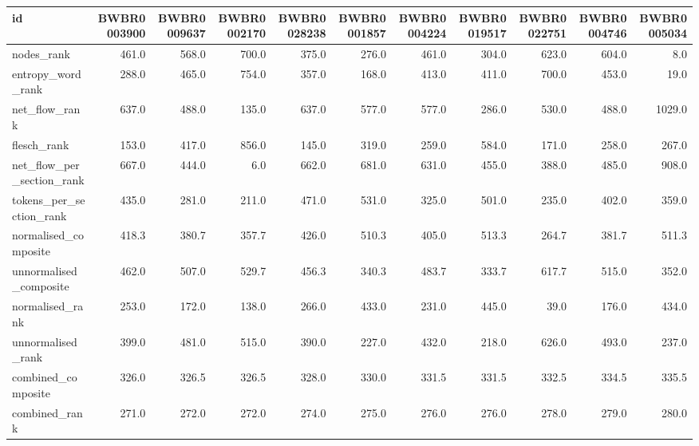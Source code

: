 \begin{tabular}{lrrrrrrrrrr}
\toprule
id & BWBR0003900 & BWBR0009637 & BWBR0002170 & BWBR0028238 & BWBR0001857 & BWBR0004224 & BWBR0019517 & BWBR0022751 & BWBR0004746 & BWBR0005034 \\
\midrule
nodes\_rank & 461.0 & 568.0 & 700.0 & 375.0 & 276.0 & 461.0 & 304.0 & 623.0 & 604.0 & 8.0 \\
\cline{1-11}
entropy\_word\_rank & 288.0 & 465.0 & 754.0 & 357.0 & 168.0 & 413.0 & 411.0 & 700.0 & 453.0 & 19.0 \\
\cline{1-11}
net\_flow\_rank & 637.0 & 488.0 & 135.0 & 637.0 & 577.0 & 577.0 & 286.0 & 530.0 & 488.0 & 1029.0 \\
\cline{1-11}
flesch\_rank & 153.0 & 417.0 & 856.0 & 145.0 & 319.0 & 259.0 & 584.0 & 171.0 & 258.0 & 267.0 \\
\cline{1-11}
net\_flow\_per\_section\_rank & 667.0 & 444.0 & 6.0 & 662.0 & 681.0 & 631.0 & 455.0 & 388.0 & 485.0 & 908.0 \\
\cline{1-11}
tokens\_per\_section\_rank & 435.0 & 281.0 & 211.0 & 471.0 & 531.0 & 325.0 & 501.0 & 235.0 & 402.0 & 359.0 \\
\cline{1-11}
normalised\_composite & 418.3 & 380.7 & 357.7 & 426.0 & 510.3 & 405.0 & 513.3 & 264.7 & 381.7 & 511.3 \\
\cline{1-11}
unnormalised\_composite & 462.0 & 507.0 & 529.7 & 456.3 & 340.3 & 483.7 & 333.7 & 617.7 & 515.0 & 352.0 \\
\cline{1-11}
normalised\_rank & 253.0 & 172.0 & 138.0 & 266.0 & 433.0 & 231.0 & 445.0 & 39.0 & 176.0 & 434.0 \\
\cline{1-11}
unnormalised\_rank & 399.0 & 481.0 & 515.0 & 390.0 & 227.0 & 432.0 & 218.0 & 626.0 & 493.0 & 237.0 \\
\cline{1-11}
combined\_composite & 326.0 & 326.5 & 326.5 & 328.0 & 330.0 & 331.5 & 331.5 & 332.5 & 334.5 & 335.5 \\
\cline{1-11}
combined\_rank & 271.0 & 272.0 & 272.0 & 274.0 & 275.0 & 276.0 & 276.0 & 278.0 & 279.0 & 280.0 \\
\cline{1-11}
\bottomrule
\end{tabular}

